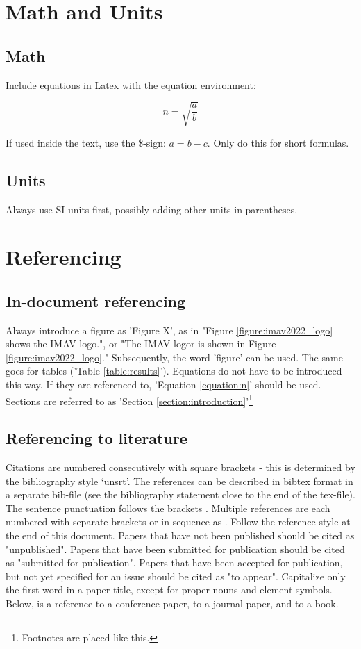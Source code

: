 \documentclass[letterpaper]{article}
\begin{document}
\section{Math and Units}

\subsection{Math}
Include equations in Latex with the equation environment:

\begin{equation} \label{equation:n}
n = \sqrt{\frac{a}{b}}
\end{equation}

If used inside the text, use the \$-sign: $a = b-c$. Only do this for short formulas.

\subsection{Units}
Always use SI units first, possibly adding other units in parentheses.

\section{Referencing}

\subsection{In-document referencing}
Always introduce a figure as 'Figure X', as in "Figure \ref{figure:imav2022_logo} shows the IMAV logo.", or "The IMAV logor is shown in Figure \ref{figure:imav2022_logo}." Subsequently, the word 'figure' can be used. The same goes for tables ('Table \ref{table:results}'). Equations do not have to be introduced this way. If they are referenced to, 'Equation \ref{equation:n}' should be used. Sections are referred to as 'Section \ref{section:introduction}'\footnote{Footnotes are placed like this.}

\subsection{Referencing to literature}
 Citations are numbered consecutively with square brackets \cite{DEWAGTER2014} - this is determined by the bibliography style `unsrt'. The references can be described in bibtex format in a separate bib-file (see the bibliography statement close to the end of the tex-file).  The sentence punctuation follows the brackets \cite{NOLFIPOWLIM}. Multiple references \cite{DEWAGTER2014,NOLFIPOWLIM} are each numbered with separate brackets or in sequence as \cite{DEWAGTER2014,NOLFIPOWLIM,BISHOP2006}.
Follow the reference style at the end of this document. Papers that have not been published should be cited as "unpublished". Papers that have been submitted for publication should be cited as "submitted for publication". Papers that have been accepted for publication, but not yet specified for an issue should be cited as "to appear". Capitalize only the first word in a paper title, except for proper nouns and element symbols.
Below, \cite{DEWAGTER2014} is a reference to a conference paper, \cite{NOLFIPOWLIM} to a journal paper, and \cite{BISHOP2006} to a book.
\end{document}
